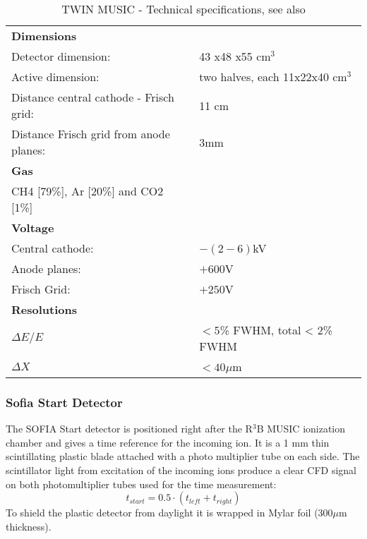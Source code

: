 \newline
\begin{table}[h!]
    \centering
    \begin{tabular}{ll}
        \hline
        \textbf{Dimensions} & \\ 
	Detector dimension: & 43 x48 x55 cm$^3$ \\ 
	Active dimension: & two halves, each  11x22x40 cm$^3$\\
	Distance central cathode - Frisch grid: & 11 cm\\
	Distance Frisch grid from anode planes: & 3mm\\ %
	\textbf{Gas} &\\
	CH4 [79\%], Ar [20\%] and CO2 [1\%] \\
	\textbf{Voltage} & \\
	Central cathode: &  $-(2-6)$kV \\
	Anode planes: & $+600$V \\
	Frisch Grid: & $+250$V\\
	\textbf{Resolutions} & \\
	$\Delta E / E$ & $< 5$\% FWHM, total < 2\% FWHM \\
	$\Delta X$ & $< 40 \mu$m\\
	\hline
    \end{tabular}
    \caption{TWIN MUSIC - Technical specifications, see also \cite{martin2021fission}}
	\label{table:twin_tecs}
\end{table}
\newline
    

\subsubsection{Sofia Start Detector}
The SOFIA Start detector is positioned right after the R$^3$B MUSIC ionization chamber and gives a time reference for the incoming ion. It is a 1 mm thin scintillating plastic blade attached with a photo multiplier tube on each side. The scintillator light from excitation of the incoming ions produce a clear CFD signal on both photomultiplier tubes used for the time measurement: \[t_{start} = 0.5 \cdot (t_{left}+t_{right}) \]\newline
To shield the plastic detector from daylight it is wrapped in Mylar foil (300$\mu$m thickness).
